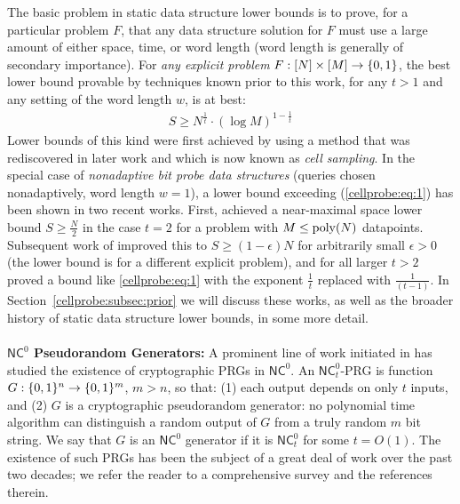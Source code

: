 The basic problem in static data structure lower bounds is to prove, for a particular problem $F$, that any data structure solution for $F$ must use a large amount of either space, time, or word length (word length is generally of secondary importance). 
For \emph{any explicit problem} $F: [N] \times [M] \to \{0,1\}$, the best lower bound provable by techniques known prior to this work, for any $t>1$ and any setting of the word length $w$, is at best:
\begin{gather}
  S \geq N^{\frac{1}{t}} \cdot (\log M)^{1 - \frac{1}{t}}   
\end{gather}
Lower bounds of this kind were first achieved by \cite{Siegel89} using a method that was rediscovered in later work and which is now known as \emph{cell sampling}.
In the special case of \emph{nonadaptive bit probe data structures} (queries chosen nonadaptively, word length $w=1$), a lower bound exceeding (\ref{cellprobe:eq:1}) has been shown in two recent works. First, \cite{viola-maximal} achieved a near-maximal space lower bound $S \geq \frac{N}{2}$ in the case $t=2$ for a problem with $M \leq \mathrm{poly}(N)$ datapoints. Subsequent work of \cite{golovnev} improved this to $S \geq (1-\epsilon)N$ for arbitrarily small $\epsilon>0$ (the lower bound is for a different explicit problem), and for all larger $t>2$ proved a bound like \ref{cellprobe:eq:1} with the exponent $\frac{1}{t}$ replaced with $\frac{1}{(t-1)}$. In Section~\ref{cellprobe:subsec:prior} we will discuss these works, as well as the broader history of static data structure lower bounds, in some more detail.
~\\~\\
{\bf \noindent $\mathsf{NC}^0$ Pseudorandom Generators:} 
A prominent line of work initiated in \cite{goldreich-prg,cryan-miltersen}
has studied the existence of cryptographic PRGs in $\mathsf{NC}^0$. An $\mathsf{NC}^0_t$-PRG is function $G: \{0,1\}^n \to \{0,1\}^m$, $m > n$, so that: (1) each output depends on only $t$ inputs, and (2) $G$ is a cryptographic pseudorandom generator: no polynomial time algorithm can distinguish a random output of $G$ from a truly random $m$ bit string.
We say that $G$ is an $\mathsf{NC}^0$ generator if it is $\mathsf{NC}^0_t$ for some $t = O(1)$. 
The existence of such PRGs has been the subject of a great deal of work over the past two decades; we refer the reader to a comprehensive survey \cite{apple-survey} and the references therein. 

